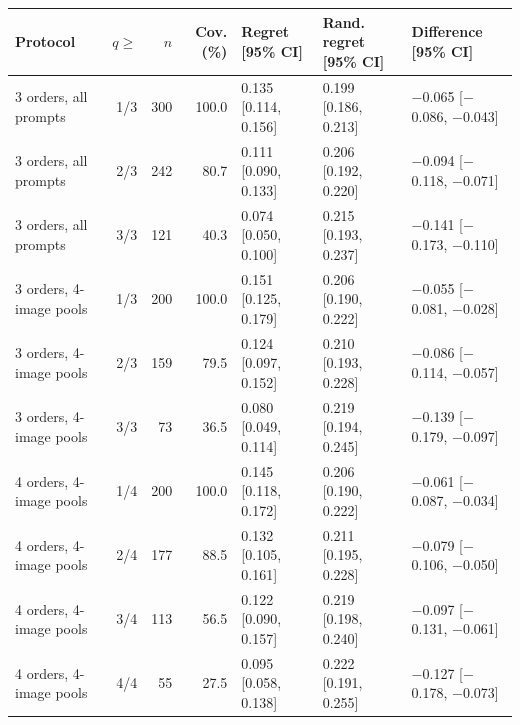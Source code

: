 

\footnotesize
\begin{tabular*}{\textwidth}{@{\extracolsep{\fill}}lrrrlll}
\toprule
Protocol & $q\ge$ & $n$ & Cov. (\%) & Regret [95\% CI] & Rand. regret [95\% CI] & Difference [95\% CI]\\
\midrule
3 orders, all prompts & 1/3 & 300 & 100.0 & 0.135 [0.114, 0.156] & 0.199 [0.186, 0.213] & $-$0.065 [$-$0.086, $-$0.043]\\
3 orders, all prompts & 2/3 & 242 & 80.7 & 0.111 [0.090, 0.133] & 0.206 [0.192, 0.220] & $-$0.094 [$-$0.118, $-$0.071]\\
3 orders, all prompts & 3/3 & 121 & 40.3 & 0.074 [0.050, 0.100] & 0.215 [0.193, 0.237] & $-$0.141 [$-$0.173, $-$0.110]\\
3 orders, 4-image pools & 1/3 & 200 & 100.0 & 0.151 [0.125, 0.179] & 0.206 [0.190, 0.222] & $-$0.055 [$-$0.081, $-$0.028]\\
3 orders, 4-image pools & 2/3 & 159 & 79.5 & 0.124 [0.097, 0.152] & 0.210 [0.193, 0.228] & $-$0.086 [$-$0.114, $-$0.057]\\
3 orders, 4-image pools & 3/3 & 73 & 36.5 & 0.080 [0.049, 0.114] & 0.219 [0.194, 0.245] & $-$0.139 [$-$0.179, $-$0.097]\\
4 orders, 4-image pools & 1/4 & 200 & 100.0 & 0.145 [0.118, 0.172] & 0.206 [0.190, 0.222] & $-$0.061 [$-$0.087, $-$0.034]\\
4 orders, 4-image pools & 2/4 & 177 & 88.5 & 0.132 [0.105, 0.161] & 0.211 [0.195, 0.228] & $-$0.079 [$-$0.106, $-$0.050]\\
4 orders, 4-image pools & 3/4 & 113 & 56.5 & 0.122 [0.090, 0.157] & 0.219 [0.198, 0.240] & $-$0.097 [$-$0.131, $-$0.061]\\
4 orders, 4-image pools & 4/4 & 55 & 27.5 & 0.095 [0.058, 0.138] & 0.222 [0.191, 0.255] & $-$0.127 [$-$0.178, $-$0.073]\\
\bottomrule
\end{tabular*}
